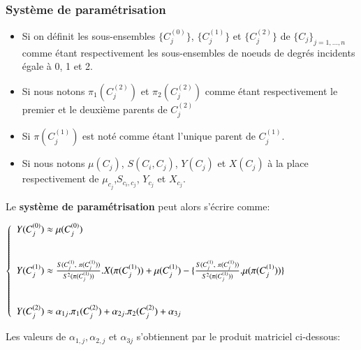\documentclass[a4paper]{article}
\begin{document}
\newpage
\subsubsection{Système de paramétrisation}
\begin{itemize}
\item Si on définit les sous-ensembles $\{C_{j}^{(0)}\}$,  $\{C_{j}^{(1)}\}$ et $\{C_{j}^{(2)}\}$ de $\{C_{j}\}_{j=1,...,n}$ comme étant respectivement les sous-ensembles de noeuds de degrés incidents égale à 0, 1 et 2.

\item Si nous notons  $\pi_{1}(C_{j}^{(2)})$ et  $\pi_{2}(C_{j}^{(2)})$ comme étant respectivement le premier et le deuxième parents de $C_{j}^{(2)}$ 

\item Si $\pi(C_{j}^{(1)})$ est noté comme étant l'unique parent de $C_{j}^{(1)}$.

\item Si nous notons  $\mu(C_{j})$, $S(C_{i},C_{j})$, $Y(C_{j})$ et $X(C_{j})$  à la place respectivement de  $\mu_{c_{j}}$,$S_{c_{i},c_{j}}$, $Y_{c_{j}}$ et $X_{c_{j}}$.
\end{itemize}

Le \textbf{système de paramétrisation} peut alors s'écrire comme:

$\left\lbrace 
\begin{array}{lcl} 
Y(C_{j}^{(0)})\approx\mu(C_{j}^{(0)}) \\ \\ \\

Y(C_{j}^{(1)})\approx \frac{ S(C_{j}^{(1)},\ \pi(C_{j}^{(1)}))}{S^{2}(\pi(C_{j}^{(1)}))}. X(\pi(C_{j}^{(1)}))+ \mu(C_{j}^{(1)})-\{\frac{ S(C_{j}^{(1)},\ \pi(C_{j}^{(1)}))}{S^{2}(\pi(C_{j}^{(1)}))}.\mu(\pi(C_{j}^{(1)}))\} \\ \\ \\

Y(C_{j}^{(2)})\approx\alpha_{1j}.\pi_{1}(C_{j}^{(2)})+\alpha_{2j}.\pi_{2}(C_{j}^{(2)})+\alpha_{3j}\\
\end{array}\right.\\ \\$


Les valeurs de $\alpha_{1,j},\alpha_{2,j}$ et $\alpha_{3j}$ s'obtiennent par le produit matriciel ci-dessous:
\end{document}
